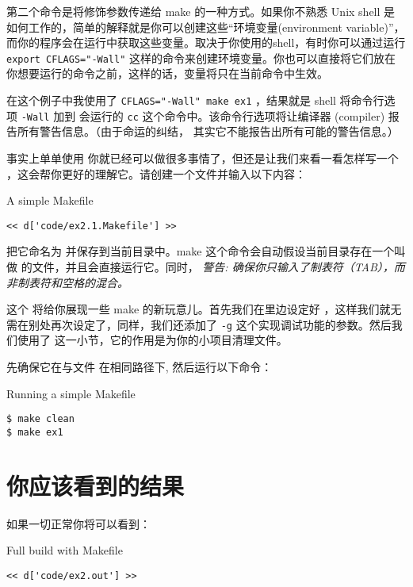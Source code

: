 第二个命令是将修饰参数传递给 make 的一种方式。如果你不熟悉 Unix shell 是如何工作的，简单的解释就是你可以创建这些“环境变量(environment variable)”，而你的程序会在运行中获取这些变量。取决于你使用的shell，有时你可以通过运行 \verb|export CFLAGS="-Wall"| 这样的命令来创建环境变量。你也可以直接将它们放在你想要运行的命令之前，这样的话，变量将只在当前命令中生效。

在这个例子中我使用了 \verb|CFLAGS="-Wall" make ex1| ，结果就是 shell 将命令行选项 \verb|-Wall| 加到  会运行的 \verb|cc| 这个命令中。该命令行选项将让编译器 (compiler)  报告所有警告信息。（由于命运的纠结， 其实它不能报告出所有可能的警告信息。）

事实上单单使用  你就已经可以做很多事情了，但还是让我们来看一看怎样写一个  ，这会帮你更好的理解它。请创建一个文件并输入以下内容：

\begin{code}{A simple Makefile}
\begin{lstlisting}
<< d['code/ex2.1.Makefile'] >>
\end{lstlisting}
\end{code}

把它命名为  并保存到当前目录中。make 这个命令会自动假设当前目录存在一个叫做  的文件，并且会直接运行它。同时， \emph{警告: 确保你只输入了制表符（TAB），而非制表符和空格的混合。}

这个  将给你展现一些 make 的新玩意儿。首先我们在里边设定好 ，这样我们就无需在别处再次设定了，同样，我们还添加了 \verb|-g| 这个实现调试功能的参数。然后我们使用了  这一小节，它的作用是为你的小项目清理文件。

先确保它在与文件  在相同路径下, 然后运行以下命令：

\begin{Terminal}{Running a simple Makefile}
\begin{lstlisting}
$ make clean
$ make ex1
\end{lstlisting}
\end{Terminal}


\section{你应该看到的结果}

如果一切正常你将可以看到：

\begin{Terminal}{Full build with Makefile}
\begin{lstlisting}
<< d['code/ex2.out'] >>
\end{lstlisting}
\end{Terminal}

